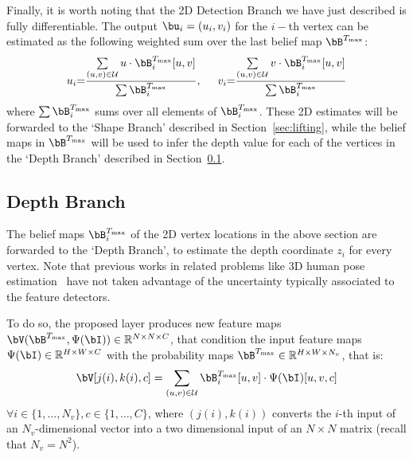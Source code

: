 \documentclass[10pt,twocolumn,letterpaper]{article}
\begin{document}
 


Finally, it is worth noting that the 2D Detection Branch we have just described is fully differentiable. The output $\bu_i=(u_i,v_i)$ for the $i-$th vertex can be estimated as the following weighted sum over the last belief map $\bB^{T_{\textrm{max}}}$:
\begin{equation}\label{eq:detection2d}
u_i\hspace{-1mm}=\hspace{-1mm}\frac{\sum\limits_{(u,v)\in\mathcal{U}}u\cdot \bB^{T_{\textrm{max}}}_i[u,v]}{\sum \bB^{T_{\textrm{max}}}_i}, \hspace{5mm} %
v_i\hspace{-1mm}=\hspace{-1mm}\frac{\sum\limits_{(u,v)\in\mathcal{U}}v\cdot \bB^{T_{\textrm{max}}}_i[u,v]}{\sum \bB^{T_{\textrm{max}}}_i}
\nonumber
\end{equation}
where $\sum \bB^{T_{\textrm{max}}}_i$  sums over all elements of $\bB^{T_{\textrm{max}}}_i$. These  2D estimates will be forwarded to the `Shape Branch' described in Section~\ref{sec:lifting}, while the belief maps in $\bB^{T_{\textrm{max}}}$ will be used to infer the depth value for each of the vertices in the `Depth Branch' described in Section~\ref{sec:depthbranch}.


\subsection{Depth Branch}  \label{sec:depthbranch}

The belief maps $\bB_i^{T_{\textrm{max}}}$ of the 2D vertex locations in the above section are forwarded to the `Depth Branch', to estimate the depth coordinate $z_i$ for every vertex. Note that previous works in related problems like 3D human pose estimation~\cite{martinez2017simple,moreno20163d} have not taken advantage of the uncertainty typically associated to the feature detectors.

To do so, the proposed layer produces new feature maps $\bV(\bB^{T_{\textrm{max}}} ,\Psi(\bI))\in \mathbb{R}^{N\times N \times C}$, that condition the input feature maps $\Psi(\bI)\in \mathbb{R}^{H \times W \times C} $ with the probability maps  $\bB^{T_{\textrm{max}}}\in \mathbb{R}^{H\times W \times N_v}$, that is:
\begin{equation}
\bV[j(i),k(i),c] =\sum_{(u,v)\in\mathcal{U}} \bB_i^{T_{\textrm{max}}}[u,v]\cdot \Psi(\bI)[u,v,c]
\end{equation}
$\forall i \in\{1,\ldots,N_v\}, c\in\{1,\ldots,C\}$,  where $(j(i),k(i))$ converts the $i$-th input of an $N_v$-dimensional vector into a two dimensional input of an  $N\times N$  matrix (recall that $N_v=N^2$).
\end{document}
